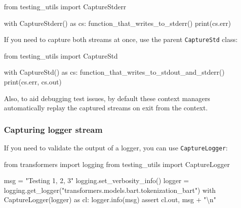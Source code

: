\documentclass[
]{report}
\newenvironment{Shaded}{\begin{snugshade}}{\end{snugshade}}
\newcommand{\BuiltInTok}[1]{\textcolor[rgb]{0.00,0.23,0.31}{#1}}
\newcommand{\CharTok}[1]{\textcolor[rgb]{0.13,0.47,0.30}{#1}}
\newcommand{\ControlFlowTok}[1]{\textcolor[rgb]{0.00,0.23,0.31}{#1}}
\newcommand{\ImportTok}[1]{\textcolor[rgb]{0.00,0.46,0.62}{#1}}
\newcommand{\NormalTok}[1]{\textcolor[rgb]{0.00,0.23,0.31}{#1}}
\newcommand{\OperatorTok}[1]{\textcolor[rgb]{0.37,0.37,0.37}{#1}}
\newcommand{\StringTok}[1]{\textcolor[rgb]{0.13,0.47,0.30}{#1}}
\begin{document}
\begin{Shaded}
\begin{Highlighting}[]
\ImportTok{from}\NormalTok{ testing\_utils }\ImportTok{import}\NormalTok{ CaptureStderr}

\ControlFlowTok{with}\NormalTok{ CaptureStderr() }\ImportTok{as}\NormalTok{ cs:}
\NormalTok{    function\_that\_writes\_to\_stderr()}
\BuiltInTok{print}\NormalTok{(cs.err)}
\end{Highlighting}
\end{Shaded}

If you need to capture both streams at once, use the parent
\texttt{CaptureStd} class:

\begin{Shaded}
\begin{Highlighting}[]
\ImportTok{from}\NormalTok{ testing\_utils }\ImportTok{import}\NormalTok{ CaptureStd}

\ControlFlowTok{with}\NormalTok{ CaptureStd() }\ImportTok{as}\NormalTok{ cs:}
\NormalTok{    function\_that\_writes\_to\_stdout\_and\_stderr()}
\BuiltInTok{print}\NormalTok{(cs.err, cs.out)}
\end{Highlighting}
\end{Shaded}

Also, to aid debugging test issues, by default these context managers
automatically replay the captured streams on exit from the context.

\subsubsection{Capturing logger stream}\label{capturing-logger-stream}

If you need to validate the output of a logger, you can use
\texttt{CaptureLogger}:

\begin{Shaded}
\begin{Highlighting}[]
\ImportTok{from}\NormalTok{ transformers }\ImportTok{import}\NormalTok{ logging}
\ImportTok{from}\NormalTok{ testing\_utils }\ImportTok{import}\NormalTok{ CaptureLogger}

\NormalTok{msg }\OperatorTok{=} \StringTok{"Testing 1, 2, 3"}
\NormalTok{logging.set\_verbosity\_info()}
\NormalTok{logger }\OperatorTok{=}\NormalTok{ logging.get\_logger(}\StringTok{"transformers.models.bart.tokenization\_bart"}\NormalTok{)}
\ControlFlowTok{with}\NormalTok{ CaptureLogger(logger) }\ImportTok{as}\NormalTok{ cl:}
\NormalTok{    logger.info(msg)}
\ControlFlowTok{assert}\NormalTok{ cl.out, msg }\OperatorTok{+} \StringTok{"}\CharTok{\textbackslash{}n}\StringTok{"}
\end{Highlighting}
\end{Shaded}
\end{document}
